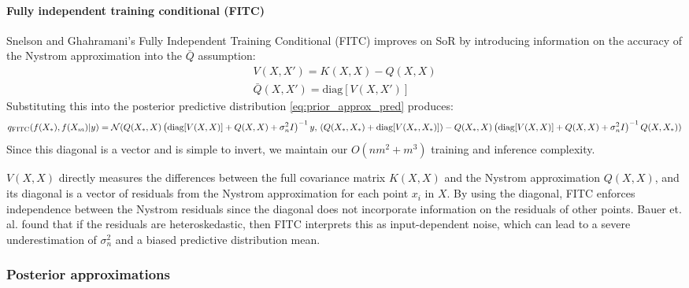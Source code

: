 \paragraph{Fully independent training conditional (FITC)}
Snelson and Ghahramani's Fully Independent Training Conditional (FITC) \cite{fitc} improves on SoR by introducing information on the accuracy of the Nystrom approximation into the $\bar{Q}$ assumption:
\begin{equation*}
    \begin{aligned}
        V(X, X') = K(X, X) - Q(X, X) \\
        \bar{Q}(X, X') = \text{diag}[V(X, X')]
    \end{aligned}
\end{equation*}
Substituting this into the posterior predictive distribution \ref{eq:prior_approx_pred} produces:
\begin{equation*}
    q_{\text{FITC}}(f(X_*), f(X_m) | y) = \mathcal{N}( \\
        Q(X_*, X) \left( \text{diag}[V(X, X)] + Q(X, X) + \sigma_n^2 I \right)^{-1} y, \\ 
        \left(Q(X_*, X_*) + \text{diag}[V(X_*, X_*)] \right) - Q(X_*, X) \left( \text{diag}[V(X, X)] + Q(X, X) + \sigma_n^2 I \right)^{-1} Q(X, X_*) \\
    )
\end{equation*}
Since this diagonal is a vector and is simple to invert, we maintain our $O(nm^2 + m^3)$ training and inference complexity.

$V(X, X)$ directly measures the differences between the full covariance matrix $K(X, X)$ and the Nystrom approximation $Q(X, X)$, and its diagonal is a vector of residuals from the Nystrom approximation for each point $x_i$ in $X$. By using the diagonal, FITC enforces independence between the Nystrom residuals since the diagonal does not incorporate information on the residuals of other points. Bauer et. al. \cite{fitc-heteroskedasticity} found that if the residuals are heteroskedastic, then FITC interprets this as input-dependent noise, which can lead to a severe underestimation of $\sigma_n^2$ and a biased predictive distribution mean.

\subsubsection{Posterior approximations}

